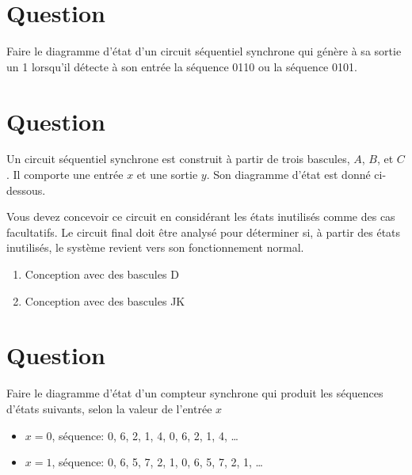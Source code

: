 \documentclass[letter, oneside]{book}
\begin{document}
\section*{Question}
\label{sec:org8f3d412}
Faire le diagramme d'état d'un circuit séquentiel synchrone qui génère
à sa sortie un 1 lorsqu'il détecte à son entrée la séquence 0110 ou la
séquence 0101.

\section*{Question}
\label{sec:org7317371}
Un circuit séquentiel synchrone est construit à partir de trois
   bascules, \(A\), \(B\), et \(C\). Il comporte une entrée \(x\) et
   une sortie \(y\). Son diagramme d'état est donné ci-dessous. 
\begin{center}

\end{center}

Vous devez concevoir ce circuit en considérant les états inutilisés
comme des cas facultatifs. Le circuit final doit être analysé pour
déterminer si, à partir des états inutilisés, le système revient vers
son fonctionnement normal.
\begin{enumerate}
\item Conception avec des bascules D
\item Conception avec des bascules JK
\end{enumerate}

\section*{Question}
\label{sec:org2acf791}
Faire le diagramme d'état d'un compteur synchrone qui produit les
  séquences d'états suivants, selon la valeur de l'entrée \(x\)

\begin{itemize}
\item \(x=0\), séquence: 0, 6, 2, 1, 4, 0, 6, 2, 1, 4, \dots{}
\item \(x=1\), séquence: 0, 6, 5, 7, 2, 1, 0, 6, 5, 7, 2, 1, \dots{}
\end{itemize}
\end{document}
